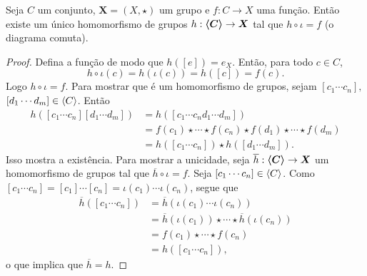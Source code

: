 \begin{prop}
Seja $C$ um conjunto, $\bm X = (X,\star)$ um grupo e $f: C \to X$ uma função. Então existe um único homomorfismo de grupos $h: \bm{\left\langle C \right\rangle} \to \bm X$ tal que $h \circ \iota = f$ (o diagrama comuta).
\begin{figure}[!h]
\centering
{}
\end{figure}
\end{prop}
\begin{proof}
Defina a função  de modo que $h([e])=e_X$. Então, para todo $c \in C$,
	\begin{equation*}
	h \circ \iota(c) = h (\iota(c)) = h([c])=f(c).
	\end{equation*}
Logo $h \circ \iota = f$. Para mostrar que é um homomorfismo de grupos, sejam $[c_1 \cdots c_n],$ $[d_1 \cdots d_m] \in \left\langle C \right\rangle$. Então
	\begin{align*}
	h([c_1 \cdots c_n][d_1 \cdots d_m]) &= h([c_1 \cdots c_nd_1 \cdots d_m]) \\
		&= f(c_1) \star \cdots \star f(c_n) \star f(d_1) \star \cdots  \star f(d_m) \\
		&= h([c_1 \cdots c_n]) \star h([d_1 \cdots d_m]).
	\end{align*}
Isso mostra a existência. Para mostrar a unicidade, seja $\overline h: \bm{\left\langle C \right\rangle} \to \bm X$ um homomorfismo de grupos tal que $\overline h \circ \iota = f$. Seja $[c_1 \cdots c_n] \in \left\langle C \right\rangle$. Como $[c_1 \cdots c_n] = [c_1] \cdots [c_n] = \iota(c_1) \cdots \iota(c_n)$, segue que
	\begin{align*}
	\overline h ([c_1 \cdots c_n]) &= \overline h(\iota(c_1) \cdots \iota(c_n)) \\
		&= \overline h(\iota(c_1)) \star \cdots \star \overline h(\iota(c_n)) \\
		&= f(c_1) \star \cdots \star f(c_n) \\
		&= h([c_1 \cdots c_n]),
	\end{align*}
o que implica que $\overline h = h$.
\end{proof}








